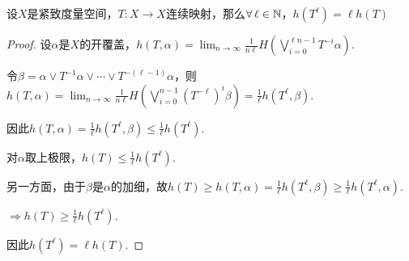 \begin{theorem}{}
    设$X$是紧致度量空间，$T:X\to X$连续映射，那么$\forall\, \ell\in\mathbb{N}$，$h(T^\ell)=\ell h(T)$
\end{theorem}
\begin{proof}
    设$\alpha$是$X$的开覆盖，$h(T,\alpha)=\lim_{n\to\infty}{\frac{1}{n\ell}H\left(\bigvee_{i=0}^{\ell n-1}T^{-i}\alpha\right)}$.\par
    令$\beta=\alpha\vee T^{-1}\alpha\vee\cdots\vee T^{-(\ell-1)}\alpha$，则$h(T,\alpha)=\lim_{n\to\infty}{\frac{1}{n\ell}H\left(\bigvee_{i=0}^{n-1}\left(T^{-\ell}\right)^i\beta\right)}=\frac{1}{\ell}h(T^\ell,\beta)$.\par
    因此$h(T,\alpha)=\frac{1}{\ell}h(T^\ell,\beta)\leq\frac{1}{\ell}h(T^\ell)$.\par
    对$\alpha$取上极限，$h(T)\leq \frac{1}{\ell}h(T^\ell)$.\par
    另一方面，由于$\beta$是$\alpha$的加细，故$h(T)\geq h(T,\alpha)=\frac{1}{\ell}h(T^\ell,\beta)\geq\frac{1}{\ell}h(T^\ell,\alpha)$.\par
    $\Rightarrow h(T)\geq\frac{1}{\ell}h(T^\ell)$.\par
    因此$h(T^\ell)=\ell h(T)$.
\end{proof}

